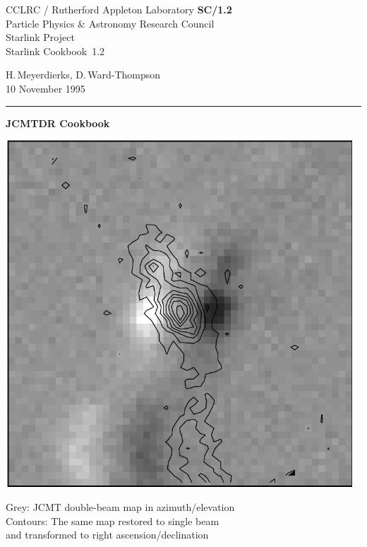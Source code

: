 \documentclass[11pt]{article}
\newcommand{\stardoccategory}  {Starlink Cookbook}
\newcommand{\stardocinitials}  {SC}
\newcommand{\stardocnumber}    {1.2}
\newcommand{\stardocauthors}   {H.\,Meyerdierks, D.\,Ward-Thompson}
\newcommand{\stardocdate}      {10 November 1995}
\newcommand{\stardoctitle}     {JCMTDR Cookbook}
\newcommand{\stardocname}{\stardocinitials /\stardocnumber}
\newenvironment{latexonly}{}{}
\begin{document}
\thispagestyle{empty}

\begin{latexonly}
   CCLRC / {\sc Rutherford Appleton Laboratory} \hfill {\bf \stardocname}\\
   {\large Particle Physics \& Astronomy Research Council}\\
   {\large Starlink Project\\}
   {\large \stardoccategory\ \stardocnumber}
   \begin{flushright}
   \stardocauthors\\
   \stardocdate
   \end{flushright}
   \vspace{-4mm}
   \rule{\textwidth}{0.5mm}
   \vspace{5mm}
   \begin{center}
   {\Huge\bf  \stardoctitle}
   \end{center}
   \vspace{5mm}

   \begin{center}
   \leavevmode\includegraphics[height=130mm]{sc1_cover}

   Grey: JCMT double-beam map in azimuth/elevation\\
   Contours: The same map restored to single beam\\
   and transformed to right ascension/declination
   \end{center}

\end{latexonly}
\end{document}
